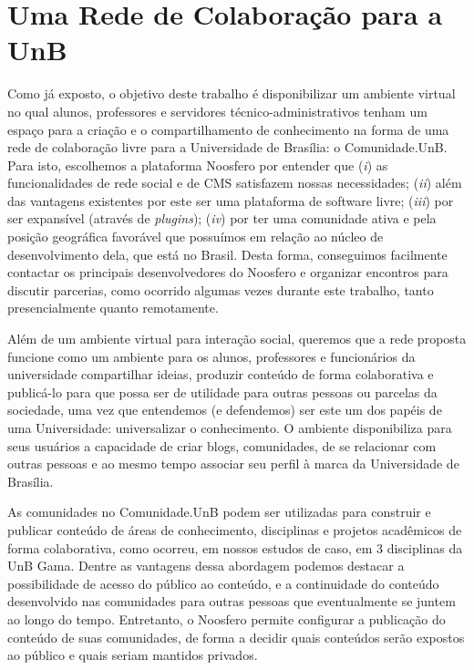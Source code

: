\chapter{Uma Rede de Colaboração para a UnB}

Como já exposto, o objetivo deste trabalho é disponibilizar um ambiente
virtual no qual alunos, professores e servidores técnico-administrativos tenham 
um espaço para a criação e o compartilhamento de conhecimento na forma de uma
rede de colaboração livre para a Universidade de Brasília: o Comunidade.UnB.
%
Para isto, escolhemos a plataforma Noosfero por entender que
(\textit{i}) as funcionalidades de rede social e de CMS satisfazem nossas 
necessidades; (\textit{ii}) além das vantagens existentes por este ser uma
plataforma de software livre; (\textit{iii}) por ser  expansível (através de
\textit{plugins}); (\textit{iv}) por ter uma comunidade ativa e pela posição
geográfica favorável que possuímos em relação ao núcleo de desenvolvimento
dela, que está no Brasil.
%
Desta forma, conseguimos facilmente contactar os principais desenvolvedores
do Noosfero e organizar encontros para discutir parcerias, como ocorrido
algumas vezes durante este trabalho, tanto presencialmente quanto remotamente.

Além de um ambiente virtual para interação social, queremos que a rede proposta
funcione como um ambiente para os alunos, professores e funcionários da
universidade compartilhar ideias, produzir conteúdo de forma colaborativa e
publicá-lo para que possa ser de utilidade para outras pessoas ou parcelas da
sociedade, uma vez que entendemos (e defendemos) ser este um dos papéis de uma Universidade:
universalizar o conhecimento.
%
O ambiente disponibiliza para seus usuários a capacidade de criar blogs,
comunidades, de se relacionar com outras pessoas e ao mesmo tempo associar seu
perfil à marca da Universidade de Brasília.

As comunidades no Comunidade.UnB podem ser utilizadas para construir e publicar
conteúdo de áreas de conhecimento, disciplinas e projetos acadêmicos de forma
colaborativa, como ocorreu, em nossos estudos de caso, em 3 disciplinas da UnB Gama.
%
Dentre as vantagens dessa abordagem podemos destacar a possibilidade de
acesso do público ao conteúdo, e a continuidade do conteúdo desenvolvido
nas comunidades para outras pessoas que eventualmente se juntem ao longo do tempo.
%
Entretanto, o Noosfero permite configurar a publicação do conteúdo de suas comunidades, de forma a decidir
quais conteúdos serão expostos ao público e quais seriam mantidos privados.

